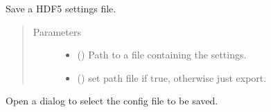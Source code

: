 \documentclass[a4paper,10pt,english]{sphinxmanual}
\begin{document}
\begin{fulllineitems}

\begin{fulllineitems}
\label{\detokenize{autodoc/mrsprint/mrsprint:mrsprint.settings.Settings.save}}
Save a HDF5 settings file.
\begin{quote}\begin{description}
\item[{Parameters}] \leavevmode\begin{itemize}
\item {} 
 () \textendash{} Path to a file containing the settings.

\item {} 
 () \textendash{} set path file if true, otherwise just export.

\end{itemize}

\end{description}\end{quote}

\end{fulllineitems}


\begin{fulllineitems}
\label{\detokenize{autodoc/mrsprint/mrsprint:mrsprint.settings.Settings.saveFile}}
Open a dialog to select the config file to be saved.

\end{fulllineitems}


\end{fulllineitems}
\end{document}
